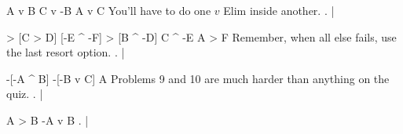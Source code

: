 \argument
 A v B
 C v -B
\argumentline
 A v C
\endargument
\Hint You'll have to do one $v$ Elim inside another.
	\answer
	. | 
	\endfitchproof
	\endanswer

\resetfitchsetup
{}
\argument
 [A ^ B] > [C > D]
 [-E ^ -F] > [B ^ -D]
 C ^ -E
\argumentline
 A > F
\endargument
\Hint Remember, when all else fails, use the last resort option.
	\answer
	. | 
	\endfitchproof
	\endanswer

\argument
 -[-A ^ B]
 -[-B v C]
\argumentline
 A
\endargument
\Hint Problems 9 and 10 are much harder than anything on the quiz.
	\answer
	. | 
	\endfitchproof
	\endanswer

\argument
 A > B
\argumentline
 -A v B
\endargument
	\answer
	. | 
	\endfitchproof
	\endanswer

\endproblems
\bye
